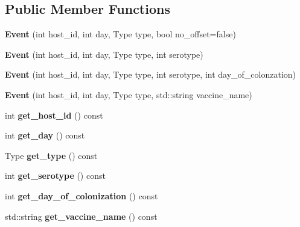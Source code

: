 \subsection*{Public Member Functions}
\begin{DoxyCompactItemize}
\item 
\mbox{\label{class_event_a8a3e3dd1f4fa9e4e5e88569dce33d459}} 
{\bfseries Event} (int host\+\_\+id, int day, Type type, bool no\+\_\+offset=false)
\item 
\mbox{\label{class_event_ad4d3beab41cb5dc749982463d5acc209}} 
{\bfseries Event} (int host\+\_\+id, int day, Type type, int serotype)
\item 
\mbox{\label{class_event_aec558a3140f11d745ca0bb4fda5c3ad3}} 
{\bfseries Event} (int host\+\_\+id, int day, Type type, int serotype, int day\+\_\+of\+\_\+colonzation)
\item 
\mbox{\label{class_event_aa1212ada7b2813ef9c619b22b423a48c}} 
{\bfseries Event} (int host\+\_\+id, int day, Type type, std\+::string vaccine\+\_\+name)
\item 
\mbox{\label{class_event_af9f150a2c48021fe3ee4866848f6e8f5}} 
int {\bfseries get\+\_\+host\+\_\+id} () const
\item 
\mbox{\label{class_event_adc57f1767bcd3ab2b136d8ac34efbec3}} 
int {\bfseries get\+\_\+day} () const
\item 
\mbox{\label{class_event_ab27e0682049384339d2c2bbfce232abd}} 
Type {\bfseries get\+\_\+type} () const
\item 
\mbox{\label{class_event_af85a4a32877cb7de66a0cb537cc58679}} 
int {\bfseries get\+\_\+serotype} () const
\item 
\mbox{\label{class_event_a7bd7b82ccdd642e0615cb972eea8bb5b}} 
int {\bfseries get\+\_\+day\+\_\+of\+\_\+colonization} () const
\item 
\mbox{\label{class_event_aa1844443277fa45a9f1261c6048e3639}} 
std\+::string {\bfseries get\+\_\+vaccine\+\_\+name} () const
\item 

\end{DoxyCompactItemize}

